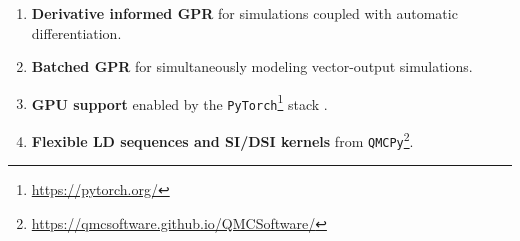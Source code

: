 \documentclass[12pt,lettersize,oneside]{book} %
\begin{document}
\begin{talk}
\begin{enumerate}
          \item \textbf{Derivative informed GPR} for simulations coupled with automatic differentiation. 
          \item \textbf{Batched GPR} for simultaneously modeling vector-output simulations.
          \item \textbf{GPU support} enabled by the \texttt{PyTorch}\footnote{\url{https://pytorch.org/}} stack . 
          \item \textbf{Flexible LD sequences and SI/DSI kernels} from \texttt{QMCPy}\footnote{\url{https://qmcsoftware.github.io/QMCSoftware/}}.
        \end{enumerate}








\end{talk}
\end{document}
